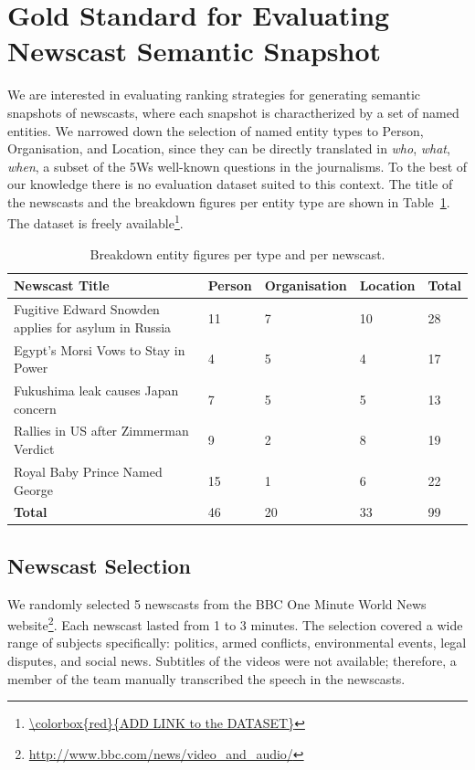 \documentclass{llncs}
\newcommand{\todo}[1]{\colorbox{red}{#1}}
\begin{document}
\section{Gold Standard for Evaluating Newscast Semantic Snapshot}
\label{sec:GoldStandard}
We are interested in evaluating ranking strategies for generating semantic snapshots of newscasts, where each snapshot is charactherized by a set of named entities. We narrowed down the selection of named entity types to Person, Organisation, and Location, since they can be directly translated in \textit{who}, \textit{what}, \textit{when}, a subset of the 5Ws well-known questions in the journalisms. To the best of our knowledge there is no evaluation dataset suited to this context. The title of the newscasts and the breakdown figures per entity type are shown in Table~\ref{table:entitydistribution}. The dataset is freely available\footnote{\url{\todo{ADD LINK to the DATASET}}}.
\vspace{-1.5em}
\begin{table}
\begin{tabular}{| p{6cm} | l| l| l| l|}
  \hline
  \textbf{Newscast Title} & \textbf{Person} & \textbf{Organisation} &\textbf{Location} & \textbf{Total} \\
    \hline
  Fugitive Edward Snowden applies for asylum in Russia & 11 & 7 & 10 & 28 \\
    \hline
 Egypt's Morsi Vows to Stay in Power & 4 & 5 & 4 & 17 \\
    \hline
 Fukushima leak causes Japan concern & 7 & 5 & 5 & 13\\
    \hline
 Rallies in US after Zimmerman Verdict & 9 & 2 & 8 & 19 \\
    \hline
 Royal Baby Prince Named George & 15 & 1 & 6 & 22 \\
    \hline
    \textbf{Total}  & 46 & 20 & 33 & 99\\
  \hline
\end{tabular}
\caption[Table caption text]{Breakdown entity figures per type and per newscast.}
\label{table:entitydistribution}
\end{table}

\vspace{-2em}
\subsection{Newscast Selection}
We randomly selected 5 newscasts from the BBC One Minute World News website\footnote{\url{http://www.bbc.com/news/video_and_audio/}}. Each newscast lasted from 1 to 3 minutes. The selection covered a wide range of subjects specifically: politics, armed conflicts, environmental events, legal disputes, and social news. 
Subtitles of the videos were not available; therefore, a member of the team manually transcribed the speech in the newscasts.
\end{document}
